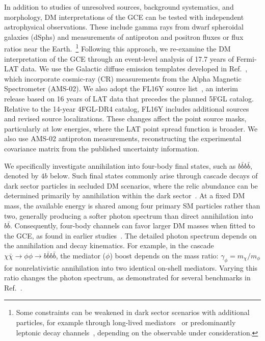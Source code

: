 \documentclass[superscriptaddress,
showpacs,preprintnumbers,nofootinbib,eqsecnum,amsmath,amssymb,aps,11pt, groupedaddress, floatfix]{revtex4-2}
\begin{document}
In addition to studies of unresolved sources, background systematics, and morphology, DM interpretations of the GCE can be tested with independent astrophysical observations.
These include gamma rays from dwarf spheroidal galaxies (dSphs)
and measurements of antiproton and positron fluxes or flux ratios
near the Earth.~\footnote{Some constraints can be weakened in dark sector scenarios with additional particles, for example through long-lived mediators~\cite{Kim:2017qaw} or predominantly leptonic decay channels~\cite{Arkani-Hamed:2008hhe}, depending on the observable under consideration.}
Following this approach, we re-examine the DM interpretation of the GCE through an event-level analysis of 17.7 years of
Fermi-LAT data.
We use the Galactic diffuse emission templates developed in
Ref.~\cite{Cholis:2021rpp}, which incorporate cosmic-ray (CR) measurements from the Alpha Magnetic Spectrometer (AMS-02).
We also adopt the FL16Y source list~\cite{Ballet:2026kpq}, an interim release based on 16 years of LAT data that precedes
the planned 5FGL catalog.
Relative to the 14-year 4FGL-DR4 catalog, FL16Y includes additional
sources and revised source localizations.
These changes affect the point source masks, particularly at
low energies, where the LAT point spread function is broader.
We also use AMS-02 antiproton measurements, reconstructing the experimental covariance matrix from the published uncertainty information.


We specifically investigate annihilation into four-body final
states, such as $b\bar b b\bar b$, denoted by $4b$ below.
Such final states commonly arise through cascade decays of dark
sector particles in secluded DM scenarios, where the relic
abundance can be determined primarily by annihilation within the
dark sector~\cite{Pospelov:2007mp,Kim:2009ke,Kim:2016csm,
Elor:2015tva,DEramo:2026tvx}.
At a fixed DM mass, the available energy is shared among four
primary SM particles rather than two, generally producing a
softer photon spectrum than direct annihilation into $b\bar b$.
Consequently, four-body channels can favor larger DM masses when fitted to the GCE, as found in earlier studies~\cite{Cline:2015qha,Dutta:2015ysa}.
The detailed photon spectrum depends on the annihilation and
decay kinematics.
For example, in the cascade
$\chi \bar \chi \to \phi \phi \to b \bar b b \bar b$,
the mediator ($\phi$) boost depends on the mass ratio:
$\gamma_\phi = m_\chi/m_\phi$ for nonrelativistic annihilation into
two identical on-shell mediators.
Varying this ratio changes the photon spectrum, as demonstrated for several benchmarks in Ref.~\cite{Profumo:2017obk}.
\end{document}
